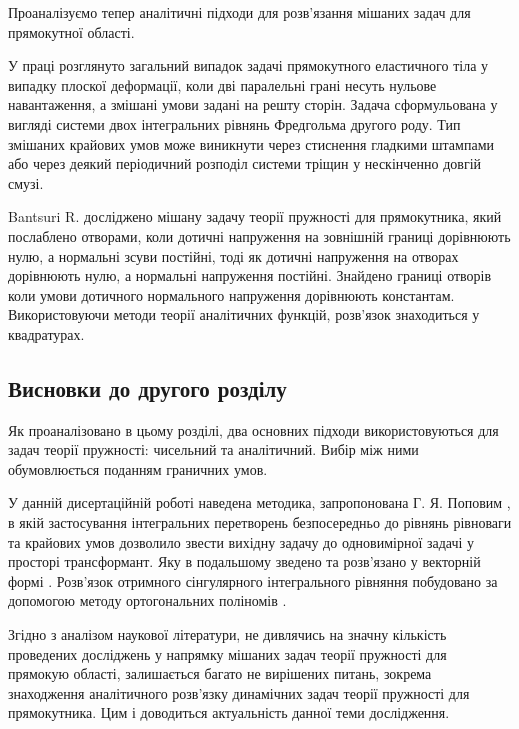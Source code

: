Проаналізуємо тепер аналітичні підходи для розв'язання мішаних задач для прямокутної області.

У праці \cite{shyam_1} розглянуто загальний випадок задачі прямокутного еластичного тіла у випадку плоскої деформації,
коли дві паралельні грані несуть нульове навантаження, а змішані умови задані на решту сторін.
Задача сформульована у вигляді системи двох інтегральних рівнянь Фредгольма другого роду.
Тип змішаних крайових умов може виникнути через стиснення гладкими штампами або через деякий періодичний розподіл системи тріщин у нескінченно довгій смузі.


Bantsuri R. \cite{bantsuri_1} досліджено мішану задачу теорії пружності для прямокутника, який послаблено отворами,
коли дотичні напруження на зовнішній границі дорівнюють нулю, а нормальні зсуви постійні,
тоді як дотичні напруження на отворах дорівнюють нулю, а нормальні напруження постійні.
Знайдено границі отворів коли умови дотичного нормального напруження дорівнюють константам.
Використовуючи методи теорії аналітичних функцій, розв'язок знаходиться у квадратурах.


\subsection{Висновки до другого розділу}

Як проаналізовано в цьому розділі, два основних підходи використовуються для задач теорії пружності: чисельний та аналітичний.
Вибір між ними обумовлюється поданням граничних умов.

У данній дисертаційній роботі наведена методика, запропонована Г. Я. Поповим \cite{popov_4},
в якій застосування інтегральних перетворень безпосередньо до рівнянь рівноваги та крайових умов
дозволило звести вихідну задачу до одновимірної задачі у просторі трансформант.
Яку в подальшому зведено та розв'язано у векторній формі \cite{popov_5}.
Розв'язок отримного сінгулярного інтегрального рівняння побудовано за допомогою методу ортогональних поліномів \cite{popov_3}.

Згідно з аналізом наукової літератури,
не дивлячись на значну кількість проведених досліджень у напрямку мішаних задач теорії пружності для прямокую області,
залишається багато не вирішених питань, зокрема знаходження аналітичного розв'язку динамічних задач теорії пружності для прямокутника.
Цим і доводиться актуальність данної теми дослідження.